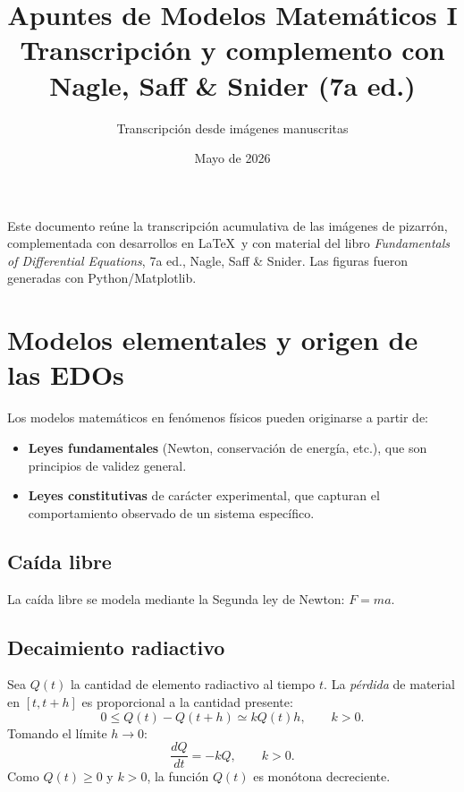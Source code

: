 \documentclass[11pt,letterpaper]{article}
\title{\textbf{Apuntes de Modelos Matemáticos I}\\[4pt]
       \large Transcripción y complemento con Nagle, Saff \& Snider (7a ed.)}
\author{Transcripción desde imágenes manuscritas}
\date{Mayo de 2026}
\begin{document}
\maketitle

\begin{tcolorbox}[colback=gray!8, colframe=gray!50, title=Nota sobre este documento]
Este documento reúne la transcripción acumulativa de las imágenes de pizarrón,
complementada con desarrollos en \LaTeX\ y con material del libro
\emph{Fundamentals of Differential Equations}, 7a ed., Nagle, Saff \& Snider.
Las figuras fueron generadas con Python/Matplotlib.
\end{tcolorbox}

\tableofcontents
\newpage

\section{Modelos elementales y origen de las EDOs}

Los modelos matemáticos en fenómenos físicos pueden originarse a partir de:
\begin{itemize}
    \item \textbf{Leyes fundamentales} (Newton, conservación de energía, etc.),
          que son principios de validez general.
    \item \textbf{Leyes constitutivas} de carácter experimental, que capturan el
          comportamiento observado de un sistema específico.
\end{itemize}

\subsection{Caída libre}

La caída libre se modela mediante la Segunda ley de Newton: $F=ma$.

\subsection{Decaimiento radiactivo}

Sea $Q(t)$ la cantidad de elemento radiactivo al tiempo $t$. La \emph{pérdida}
de material en $[t,t+h]$ es proporcional a la cantidad presente:
\[
0\leq Q(t)-Q(t+h)\simeq kQ(t)h,\qquad k>0.
\]
Tomando el límite $h\to 0$:
\[
\boxed{\frac{dQ}{dt}=-kQ,\qquad k>0.}
\]
Como $Q(t)\geq 0$ y $k>0$, la función $Q(t)$ es monótona decreciente.
\end{document}
